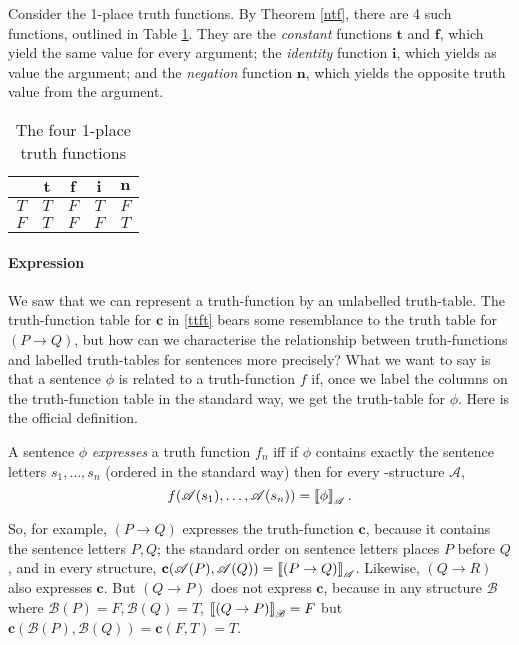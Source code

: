 Consider the 1-place truth functions. By Theorem \ref{ntf}, there are 4 such functions, outlined in Table \ref{t1tf}. They are the \emph{constant} functions $\mathbf{t}$ and $\mathbf{f}$, which yield the same value for every argument; the \emph{identity} function $\mathbf{i}$, which yields as value the argument; and the \emph{negation} function $\mathbf{n}$, which yields the opposite truth value from the argument. 
\begin{table}[b]
	\centering
	\begin{tabular}{c|cccc}
		\toprule
		& $\mathbf{t}$ & $\mathbf{f}$ & $\mathbf{i}$ & $\mathbf{n}$ \\
		\midrule
		$T$ & $T$ & $F$ & $T$ & $F$ \\
		$F$ & $T$ & $F$ & $F$ & $T$ \\
		\bottomrule
	\end{tabular}
	\caption{The four 1-place truth functions\label{t1tf}}
\end{table}

\paragraph{Expression} We saw that we can represent a truth-function by an unlabelled truth-table. The truth-function table for $\mathbf{c}$ in \autoref{ttft} bears some resemblance to the truth table for $(P\to Q)$, but how can we characterise the relationship between truth-functions and labelled truth-tables for sentences more precisely? What we want to say is that a sentence $\phi$ is related to a truth-function $f$ if, once we label the columns on the truth-function table in the standard way, we get the truth-table for $\phi$. Here is the official definition.  
\begin{definition}[Expression]
A sentence $\phi$ \emph{expresses} a truth function $f_{n}$ iff if $\phi$ contains exactly the sentence letters $s_{1},…,s_{n}$ (ordered in the standard way)  then for every \lone-structure $\mathscr{A}$, $$f(\mathscr{A}(s_{1}),\ldots,\mathscr{A}(s_{n}))= \left\llbracket \phi\right\rrbracket_{\mathscr{A}}.$$ 
\end{definition} 
So, for example, $(P\to Q)$ expresses the truth-function $\mathbf{c}$, because it contains the sentence letters $P,Q$; the standard order on sentence letters places $P$ before $Q$, and in every structure, $\mathbf{c}(\mathscr{A}(P),\mathscr{A}(Q)) = \left\llbracket (P\to Q)\right\rrbracket_{\mathscr{A}}$. Likewise, $(Q \to R)$ also expresses $\mathbf{c}$. But $(Q\to P)$ does not express $\mathbf{c}$, because in any structure $\mathscr{B}$ where $\mathscr{B}(P)=F,\mathscr{B}(Q)=T$, $\left\llbracket (Q \to P)\right\rrbracket_{\mathscr{B}}=F$ but $\mathbf{c}(\mathscr{B}(P),\mathscr{B}(Q)) = \mathbf{c}(F,T) = T$. 
 

